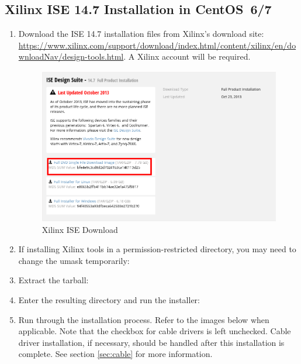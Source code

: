 \begin{flushleft}
\subsection{Xilinx ISE 14.7 Installation in CentOS~6/7}
\label{sec:ise}
\begin{flushleft}
\begin{enumerate}
\item Download the ISE 14.7 installation files from Xilinx's download site:
\url{https://www.xilinx.com/support/download/index.html/content/xilinx/en/downloadNav/design-tools.html}. A Xilinx account will be required.
\begin{figure}[ht]
	\centerline{\includegraphics[scale=0.4]{figures/xilinx_ise_download}}
	\caption{Xilinx ISE Download}
\end{figure}
\item If installing Xilinx tools in a permission-restricted directory, you may need to change the umask temporarily:\newline
{}\newline
{}
\item Extract the tarball:\newline
{}
\item Enter the resulting directory and run the installer:\newline
{}\newline
{}\newline
\pagebreak
\item Run through the installation process. Refer to the images below when applicable. Note that the checkbox for cable drivers is left unchecked. Cable driver installation, if necessary, should be handled after this installation is complete. See section \ref{sec:cable} for more information.

\end{enumerate}
\end{flushleft}
\end{flushleft}

